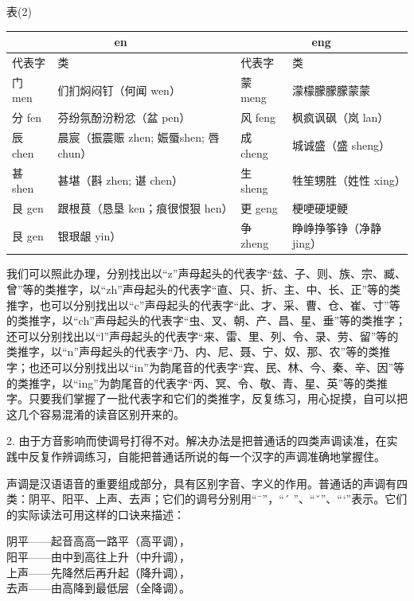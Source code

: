表(2)

\noindent
\begin{tabular}{|p{3em}|p{8em}|p{4em}|p{7em}|}
	\hline
	\multicolumn{2}{|c|}{en} & \multicolumn{2}{|c|}{eng}\\
	\hline
	代表字 & 类 & 代表字 & 类\\
	\hline
	门 men & 们扪焖闷钉（何闻 wen） & 蒙 meng & 濛檬朦朦朦蒙蒙\\
	\hline
	分 fen & 芬纷氛酚汾粉忿（盆 pen） & 风 feng & 枫疯讽砜（岚 lan）\\
	\hline
	辰 chen & 晨宸（振震赈 zhen; 娠蜃shen; 唇chun） & 成 cheng & 城诚盛（盛 sheng）\\
	\hline
	甚 shen & 甚堪（斟 zhen; 谌 chen） & 生 sheng & 牲笙甥胜（姓性 xing）\\
	\hline
	艮 gen & 跟根茛（恳垦 ken；痕很恨狠 hen） & 更 geng & 梗哽硬埂鲠\\
	\hline
	艮 gen & 银珢龈 yin） & 争 zheng & 睁峥挣筝铮（净静 jing）\\
	\hline
\end{tabular}
\vspace{0.5em}

我们可以照此办理，分别找出以“z”声母起头的代表字“兹、子、则、族、宗、臧、曾”等的类推字，以“zh”声母起头的代表字“直、只、折、主、中、长、正”等的类推字，也可以分别找出以“c”声母起头的代表字“此、才、采、曹、仓、崔、寸”等的类推字，以“ch”声母起头的代表字“虫、叉、朝、产、昌、星、垂”等的类推字；还可以分别找出以“l”声母起头的代表字“来、雷、里、列、令、录、劳、留”等的类推字，以“n”声母起头的代表字“乃、内、尼、聂、宁、奴、那、农”等的类推字；也还可以分别找出以“in”为韵尾音的代表字“宾、民、林、今、秦、辛、因”等的类推字，以“ing”为韵尾音的代表字“丙、冥、令、敬、青、星、英”等的类推字。只要我们掌握了一批代表字和它们的类推字，反复练习，用心捉摸，自可以把这几个容易混淆的读音区别开来的。

2. 由于方音影响而使调号打得不对。解决办法是把普通话的四类声调读准，在实践中反复作辨调练习，自能把普通话所说的每一个汉字的声调准确地掌握住。

声调是汉语语音的重要组成部分，具有区别字音、字义的作用。普通话的声调有四类：阴平、阳平、上声、去声；它们的调号分别用“¯”，“´ ”、“ˇ”、“`”表示。它们的实际读法可用这样的口诀来描述：
\begin{center}
阴平——起音高高一路平（高平调），\\
阳平——由中到高往上升（中升调），\\
上声——先降然后再升起（降升调），\\
去声——由高降到最低层（全降调）。\\
\end{center}

